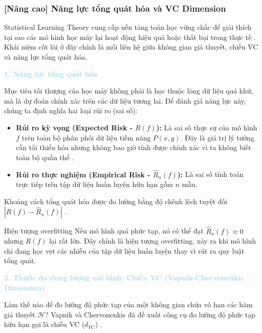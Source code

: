 \subsubsection{[Nâng cao] Năng lực tổng quát hóa và VC Dimension}

Statistical Learning Theory cung cấp nền tảng toán học vững chắc để giải thích tại sao các mô hình học máy lại hoạt động hiệu quả hoặc thất bại trong thực tế \cite{gerbelot2023applying}. Khái niệm cốt lõi ở đây chính là mối liên hệ giữa không gian giả thuyết, chiều VC và năng lực tổng quát hóa.

\vspace{0.5em}
\noindent\textcolor{lightblue}{\textbf{1. Năng lực tổng quát hóa}}
\vspace{0.5em}

Mục tiêu tối thượng của học máy không phải là học thuộc lòng dữ liệu quá khứ, mà là dự đoán chính xác trên các dữ liệu tương lai. Để đánh giá năng lực này, chúng ta định nghĩa hai loại rủi ro (sai số):

\begin{itemize}
    \item \textbf{Rủi ro kỳ vọng (Expected Risk - $R(f)$):} Là sai số thực sự của mô hình $f$ trên toàn bộ phân phối dữ liệu tiềm năng $P(x, y)$. Đây là giá trị lý tưởng cần tối thiểu hóa nhưng không bao giờ tính được chính xác vì ta không biết toàn bộ quần thể \cite{gerbelot2023applying}.
    \item \textbf{Rủi ro thực nghiệm (Empirical Risk - $\hat{R}_n(f)$):} Là sai số tính toán trực tiếp trên tập dữ liệu huấn luyện hữu hạn gồm $n$ mẫu.
\end{itemize}

Khoảng cách tổng quát hóa được đo lường bằng độ chênh lệch tuyệt đối $|R(f) - \hat{R}_n(f)|$ \cite{gerbelot2023applying}.

\begin{warningbox}{Hiện tượng overfitting}
Nếu mô hình quá phức tạp, nó có thể đạt $\hat{R}_n(f) \approx 0$ nhưng $R(f)$ lại rất lớn. Đây chính là hiện tượng overfitting, xảy ra khi mô hình chỉ đang học vẹt các nhiễu của tập dữ liệu huấn luyện thay vì rút ra quy luật tổng quát.
\end{warningbox}

\vspace{0.5em}
\noindent\textcolor{lightblue}{\textbf{2. Thước đo dung lượng mô hình: Chiều VC (Vapnik-Chervonenkis Dimension)}}
\vspace{0.5em}

Làm thế nào để đo lường độ phức tạp của một không gian chứa vô hạn các hàm giả thuyết $\mathcal{H}$? Vapnik và Chervonenkis đã đề xuất công cụ đo lường độ phức tạp hữu hạn gọi là chiều VC ($d_{VC}$) \cite{gerbelot2023applying}.

